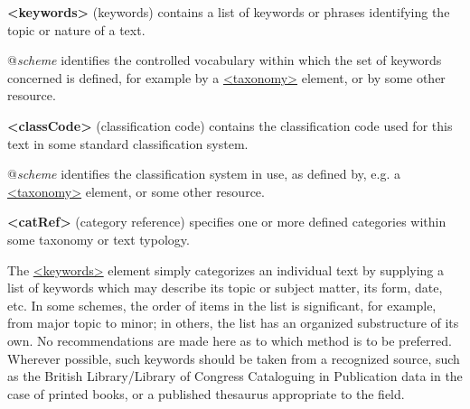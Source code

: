 \begin{sansreflist}
  
\item [\textbf{<keywords>}] (keywords) contains a list of keywords or phrases identifying the topic or nature of a text.\hfil\\[-10pt]\begin{sansreflist}
    \item[@{\itshape scheme}]
  identifies the controlled vocabulary within which the set of keywords concerned is defined, for example by a \hyperref[TEI.taxonomy]{<taxonomy>} element, or by some other resource.
\end{sansreflist}  
\item [\textbf{<classCode>}] (classification code) contains the classification code used for this text in some standard classification system.\hfil\\[-10pt]\begin{sansreflist}
    \item[@{\itshape scheme}]
  identifies the classification system in use, as defined by, e.g. a \hyperref[TEI.taxonomy]{<taxonomy>} element, or some other resource.
\end{sansreflist}  
\item [\textbf{<catRef>}] (category reference) specifies one or more defined categories within some taxonomy or text typology.
\end{sansreflist}
\par
The \hyperref[TEI.keywords]{<keywords>} element simply categorizes an individual text by supplying a list of keywords which may describe its topic or subject matter, its form, date, etc. In some schemes, the order of items in the list is significant, for example, from major topic to minor; in others, the list has an organized substructure of its own. No recommendations are made here as to which method is to be preferred. Wherever possible, such keywords should be taken from a recognized source, such as the British Library/Library of Congress Cataloguing in Publication data in the case of printed books, or a published thesaurus appropriate to the field.\par
